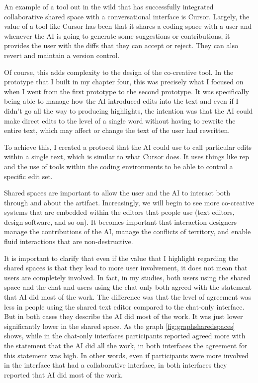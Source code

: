 An example of a tool out in the wild that has successfully integrated collaborative shared space with a conversational interface is Cursor. Largely, the value of a tool like Cursor has been that it shares a coding space with a user and whenever the AI is going to generate some suggestions or contributions, it provides the user with the diffs that they can accept or reject. They can also revert and maintain a version control. 

Of course, this adds complexity to the design of the co-creative tool. In the prototype that I built in my chapter four, this was precisely what I focused on when I went from the first prototype to the second prototype. It was specifically being able to manage how the AI introduced edits into the text and even if I didn't go all the way to producing highlights, the intention was that the AI could make direct edits to the level of a single word without having to rewrite the entire text, which may affect or change the text of the user had rewritten. 

To achieve this, I created a protocol that the AI could use to call particular edits within a single text, which is similar to what Cursor does. It uses things like rep and the use of tools within the coding environments to be able to control a specific edit set. 

Shared spaces are important to allow the user and the AI to interact both through and about the artifact. Increasingly, we will begin to see more co-creative systems that are embedded within the editors that people use (text editors, design software, and so on). It becomes important that interaction designers manage the contributions of the AI, manage the conflicts of territory, and enable fluid interactions that are non-destructive. 

It is important to clarify that even if the value that I highlight regarding the shared spaces is that they lead to more user involvement, it does not mean that users are completely involved. In fact, in my studies, both users using the shared space and the chat and users using the chat only both agreed with the statement that AI did most of the work. The difference was that the level of agreement was less in people using the shared text editor compared to the chat-only interface. But in both cases they describe the AI did most of the work. It was just lower significantly lower in the shared space. As the graph \ref{fig:graphsharedspaces} shows, while in the chat-only interfaces participants reported agreed more with the statement that the AI did all the work, in both interfaces the agreement for this statement was high. In other words, even if participants were more involved in the interface that had a collaborative interface, in both interfaces they reported that AI did most of the work. 


